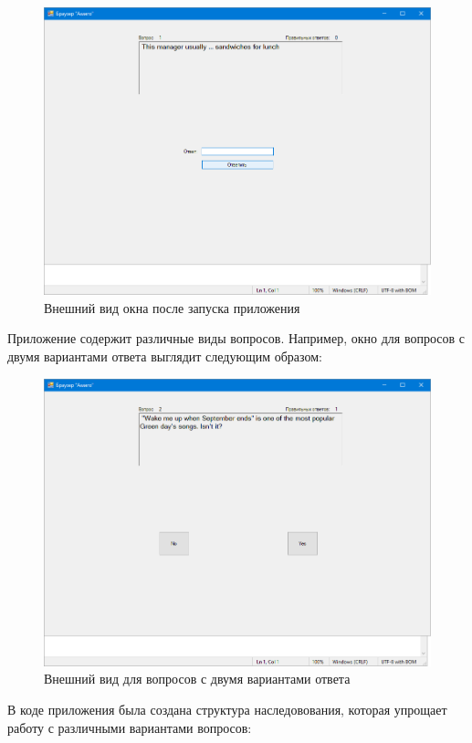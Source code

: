 \begin{figure}[H]
    \includegraphics[scale=0.6]{task9/exec.png}
    \caption{Внешний вид окна после запуска приложения}
\end{figure}
Приложение содержит различные виды вопросов. Например, окно для вопросов с двумя вариантами
ответа выглядит следующим образом:

\begin{figure}[H]
    \includegraphics[scale=0.6]{task9/yesorno.png}
    \caption{Внешний вид для вопросов с двумя вариантами ответа}
\end{figure}

В коде приложения была создана структура наследовования, которая
упрощает работу с различными вариантами вопросов:

